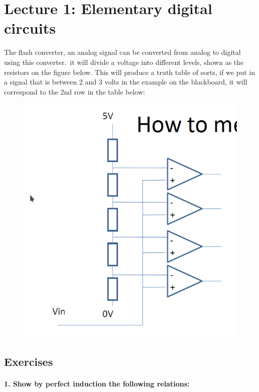 \section*{Lecture 1: Elementary digital circuits}
The flash converter, an analog signal can be converted from analog to digital using this converter.\ it will divide a voltage into different levels, shown as the resistors on the figure below.
This will produce a truth table of sorts, if we put in a signal that is between 2 and 3 volts in the example on the blackboard, it will correspond to the 2nd row in the table below:
\begin{figure}[H]
	\centering
	\includegraphics[width=\textwidth]{../digitalDesign/image.png}
\end{figure}

\subsection*{Exercises}
\paragraph{1. Show by perfect induction the following relations:}

